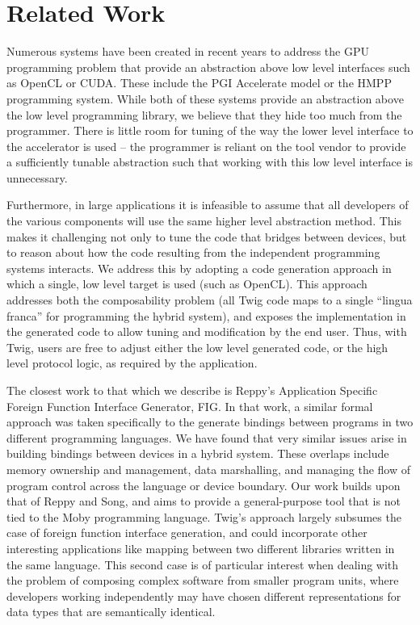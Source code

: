 
\section{Related Work}

Numerous systems have been created in recent years to address the GPU
programming problem that provide an abstraction above low level interfaces such
as OpenCL or CUDA. These include the PGI Accelerate model\cite{pgi-accelerate}
or the HMPP programming system\cite{hmpp}. While both of these systems provide
an abstraction above the low level programming library, we believe that they
hide too much from the programmer. There is little room for tuning of the way
the lower level interface to the accelerator is used -- the programmer is
reliant on the tool vendor to provide a sufficiently tunable abstraction such
that working with this low level interface is unnecessary.

Furthermore, in large applications it is infeasible to assume that all
developers of the various components will use the same higher level abstraction
method. This makes it challenging not only to tune the code that bridges between
devices, but to reason about how the code resulting from the independent
programming systems interacts. We address this by adopting a code generation
approach in which a single, low level target is used (such as OpenCL). This
approach addresses both the composability problem (all Twig code maps to a
single ``lingua franca'' for programming the hybrid system), and exposes the
implementation in the generated code to allow tuning and modification by the end
user. Thus, with Twig, users are free to adjust either the low level generated
code, or the high level protocol logic, as required by the application.

The closest work to that which we describe is Reppy's Application Specific
Foreign Function Interface Generator, FIG\cite{reppy06fig}. In that work, a
similar formal approach was taken specifically to the generate bindings between
programs in two different programming languages. We have found that very similar
issues arise in building bindings between devices in a hybrid system. These
overlaps include memory ownership and management, data marshalling, and managing
the flow of program control across the language or device boundary. Our work
builds upon that of Reppy and Song, and aims to provide a general-purpose tool
that is not tied to the Moby programming language. Twig's approach largely
subsumes the case of foreign function interface generation, and could
incorporate other interesting applications like mapping between two different
libraries written in the same language. This second case is of particular
interest when dealing with the problem of composing complex software from
smaller program units, where developers working independently may have chosen
different representations for data types that are semantically identical.

